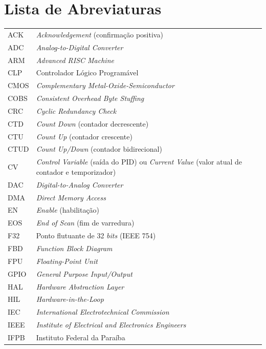 \documentclass[portuguese,12pt,oneside,a4paper]{book}
\begin{document}
\chapter*{Lista de Abreviaturas}
{\singlespacing
\begin{longtable}{@{}l@{\hspace{1em}}p{12.6cm}@{}}
	ACK		& \textit{Acknowledgement} (confirmação positiva) \\
	ADC		& \textit{Analog-to-Digital Converter} \\
	ARM 	& \textit{Advanced RISC Machine} \\
	CLP		& Controlador Lógico Programável \\
	CMOS	& \textit{Complementary Metal-Oxide-Semiconductor} \\
	COBS	& \textit{Consistent Overhead Byte Stuffing} \\
	CRC		& \textit{Cyclic Redundancy Check} \\
	CTD		& \textit{Count Down} (contador decrescente) \\
	CTU		& \textit{Count Up} (contador crescente) \\
	CTUD	& \textit{Count Up/Down} (contador bidirecional) \\
	CV		& \textit{Control Variable} (saída do PID) ou \textit{Current Value} (valor atual de contador e temporizador) \\
	DAC		& \textit{Digital-to-Analog Converter} \\
	DMA		& \textit{Direct Memory Access} \\
	EN		& \textit{Enable} (habilitação) \\
	EOS		& \textit{End of Scan} (fim de varredura) \\
	F32		& Ponto flutuante de 32 \textit{bits} (IEEE 754) \\
	FBD		& \textit{Function Block Diagram} \\
	FPU		& \textit{Floating-Point Unit} \\
	GPIO	& \textit{General Purpose Input/Output} \\
	HAL		& \textit{Hardware Abstraction Layer} \\
	HIL		& \textit{Hardware-in-the-Loop} \\
	IEC		& \textit{International Electrotechnical Commission} \\
	IEEE	& \textit{Institute of Electrical and Electronics Engineers} \\
	IFPB	& Instituto Federal da Paraíba \\

\end{longtable}}
\end{document}

